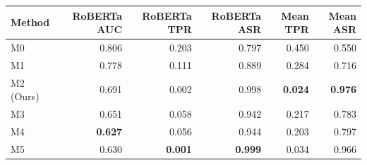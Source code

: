 \begin{tabular}{lrrrrr}
\toprule
Method & RoBERTa AUC & RoBERTa TPR & RoBERTa ASR & Mean TPR & Mean ASR \\
\midrule
M0 & 0.806 & 0.203 & 0.797 & 0.450 & 0.550 \\
M1 & 0.778 & 0.111 & 0.889 & 0.284 & 0.716 \\
M2 (Ours) & 0.691 & 0.002 & 0.998 & \textbf{0.024} & \textbf{0.976} \\
M3 & 0.651 & 0.058 & 0.942 & 0.217 & 0.783 \\
M4 & \textbf{0.627} & 0.056 & 0.944 & 0.203 & 0.797 \\
M5 & 0.630 & \textbf{0.001} & \textbf{0.999} & 0.034 & 0.966 \\
\bottomrule
\end{tabular}
